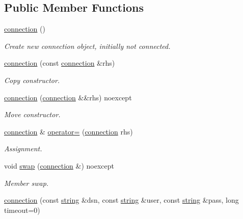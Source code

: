 \subsection*{Public Member Functions}
\begin{DoxyCompactItemize}
\item 
\mbox{\hyperlink{classnanodbc_1_1connection_aab3f1b405cc87c780b3ec5e95665284d}{connection}} ()
\begin{DoxyCompactList}\small\item\em Create new connection object, initially not connected. \end{DoxyCompactList}\item 
\mbox{\hyperlink{classnanodbc_1_1connection_aaea353f8c2f0b4576bc4c95bed330b46}{connection}} (const \mbox{\hyperlink{classnanodbc_1_1connection}{connection}} \&rhs)
\begin{DoxyCompactList}\small\item\em Copy constructor. \end{DoxyCompactList}\item 
\mbox{\hyperlink{classnanodbc_1_1connection_a6d3081d73935e5e5964b5e1937d2fbb5}{connection}} (\mbox{\hyperlink{classnanodbc_1_1connection}{connection}} \&\&rhs) noexcept
\begin{DoxyCompactList}\small\item\em Move constructor. \end{DoxyCompactList}\item 
\mbox{\hyperlink{classnanodbc_1_1connection}{connection}} \& \mbox{\hyperlink{classnanodbc_1_1connection_a47debf67d31d195f307bbc52b650cdf2}{operator=}} (\mbox{\hyperlink{classnanodbc_1_1connection}{connection}} rhs)
\begin{DoxyCompactList}\small\item\em Assignment. \end{DoxyCompactList}\item 
void \mbox{\hyperlink{classnanodbc_1_1connection_ab241b93c73d166570d6cc897c533c251}{swap}} (\mbox{\hyperlink{classnanodbc_1_1connection}{connection}} \&) noexcept
\begin{DoxyCompactList}\small\item\em Member swap. \end{DoxyCompactList}\item 
\mbox{\hyperlink{classnanodbc_1_1connection_ad61afea16c994599c792f5c74ce7c93b}{connection}} (const \mbox{\hyperlink{namespacenanodbc_abfc0ece56278e590911ec8352774c212}{string}} \&dsn, const \mbox{\hyperlink{namespacenanodbc_abfc0ece56278e590911ec8352774c212}{string}} \&user, const \mbox{\hyperlink{namespacenanodbc_abfc0ece56278e590911ec8352774c212}{string}} \&pass, long timeout=0)

\end{DoxyCompactItemize}
